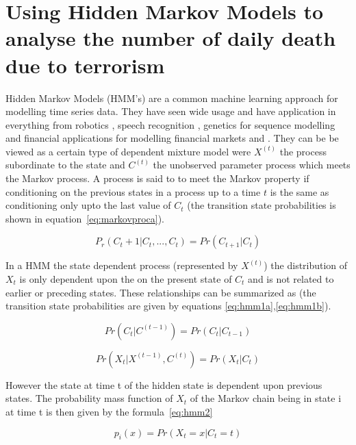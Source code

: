 \section{Using Hidden Markov Models to analyse the number of daily death due to terrorism}

Hidden Markov Models (HMM's) are a common machine learning approach for modelling time series data. They have seen wide usage and have application in everything from robotics \citep{ladd2005robotics}, speech recognition \citep{gales1998maximum}, genetics for sequence modelling \citep{sonnhammer1998pfam} and financial applications for modelling financial markets \citep{gales1998maximum} and \citep{park2009forecasting}. They can be be viewed as a certain type of dependent mixture model were $X^(t)$ the process subordinate to the state and $C^(t)$ the unobserved parameter process which meets the Markov process. A process is said to to meet the Markov property if conditioning on the previous states in a process up to a time $t$ is the same as conditioning only upto the last value of $C_t$ (the transition state probabilities is shown in equation~\ref{eq:markovproca}).

\begin{equation} P_r(C_t+1|C_t,...,C_t)=Pr(C_{t+1}|C_t)  \label{eq:markovproca}  \end{equation}

In a HMM the state dependent process (represented by $X^(t)$) the distribution of $X_t$ is only dependent upon the on the present state of $C_t$ and is not related to earlier or preceding states. These relationships can be summarized as (the transition state probabilities are given by equations \ref{eq:hmm1a},\ref{eq:hmm1b}).

\begin{equation} Pr(C_t|C^{(t-1)})=Pr(C_t|C_{t-1})  \label{eq:hmm1a}  \end{equation}

\begin{equation} Pr(X_t|X^{(t-1)},C^{(t)})=Pr(X_t|C_{t})   \label{eq:hmm1b}  \end{equation}

However the state at time t of the  hidden state is dependent upon previous states. The probability mass function of $X_t$ of the Markov chain being in state i at time t is then given by the formula~\ref{eq:hmm2} 

\begin{equation} p_{i}(x)=Pr(X_{t}=x|C_{t}=t)  \label{eq:hmm2}  \end{equation}

